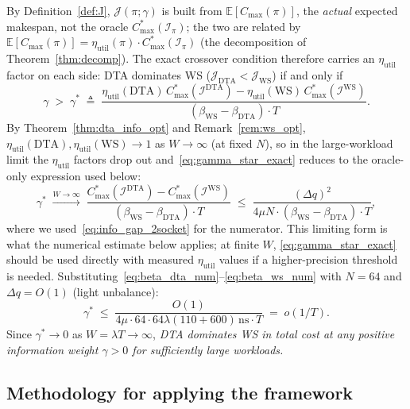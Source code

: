 \documentclass[11pt,a4paper]{article}
\begin{document}
\noindent By Definition~\ref{def:J}, $\mathcal{J}(\pi;\gamma)$ is built from
$\mathbb{E}[C_{\max}(\pi)]$, the \emph{actual} expected makespan, not the
oracle $C_{\max}^*(\mathcal{I}_\pi)$; the two are related by
$\mathbb{E}[C_{\max}(\pi)] = \eta_{\mathrm{util}}(\pi)\cdot C_{\max}^*(\mathcal{I}_\pi)$
(the decomposition of Theorem~\ref{thm:decomp}). The exact crossover condition
therefore carries an $\eta_{\mathrm{util}}$ factor on each side: DTA dominates
WS ($\mathcal{J}_{\mathrm{DTA}} < \mathcal{J}_{\mathrm{WS}}$) if and only if
\begin{equation}\label{eq:gamma_star_exact}
  \gamma \;>\; \gamma^*
  \;\triangleq\;
  \frac{\eta_{\mathrm{util}}(\mathrm{DTA})\,C_{\max}^*(\mathcal{I}^{\mathrm{DTA}})
        - \eta_{\mathrm{util}}(\mathrm{WS})\,C_{\max}^*(\mathcal{I}^{\mathrm{WS}})}{
        (\beta_{\mathrm{WS}} - \beta_{\mathrm{DTA}})\cdot T}.
\end{equation}
By Theorem~\ref{thm:dta_info_opt} and Remark~\ref{rem:ws_opt},
$\eta_{\mathrm{util}}(\mathrm{DTA}), \eta_{\mathrm{util}}(\mathrm{WS})
\to 1$ as $W\to\infty$ (at fixed $N$), so in the large-workload limit the
$\eta_{\mathrm{util}}$ factors drop out and~\eqref{eq:gamma_star_exact}
reduces to the oracle-only expression used below:
\begin{equation}\label{eq:gamma_star}
  \gamma^*
  \;\xrightarrow{W\to\infty}\;
  \frac{C_{\max}^*(\mathcal{I}^{\mathrm{DTA}}) - C_{\max}^*(\mathcal{I}^{\mathrm{WS}})}{
        (\beta_{\mathrm{WS}} - \beta_{\mathrm{DTA}})\cdot T}
  \;\leq\;
  \frac{(\Delta q)^2}{4\mu N \cdot (\beta_{\mathrm{WS}}-\beta_{\mathrm{DTA}})\cdot T},
\end{equation}
where we used~\eqref{eq:info_gap_2socket} for the numerator. This limiting
form is what the numerical estimate below applies; at finite $W$,
\eqref{eq:gamma_star_exact} should be used directly with measured
$\eta_{\mathrm{util}}$ values if a higher-precision threshold is needed.
Substituting~\eqref{eq:beta_dta_num}--\eqref{eq:beta_ws_num}
with $N=64$ and $\Delta q = O(1)$ (light unbalance):
\[
  \gamma^*
  \;\leq\;
  \frac{O(1)}{4\mu\cdot 64 \cdot 64\lambda(110+600)\,\mathrm{ns}\cdot T}
  \;=\; o(1/T).
\]
Since $\gamma^* \to 0$ as $W = \lambda T \to\infty$, \emph{DTA dominates
WS in total cost at any positive information weight $\gamma>0$ for
sufficiently large workloads.}

\subsection{Methodology for applying the framework}
\end{document}
